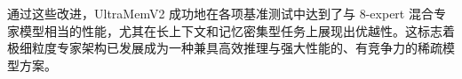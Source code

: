 通过这些改进，UltraMemV2 成功地在各项基准测试中达到了与 8-expert 混合专家模型相当的性能，尤其在长上下文和记忆密集型任务上展现出优越性。这标志着极细粒度专家架构已发展成为一种兼具高效推理与强大性能的、有竞争力的稀疏模型方案。







